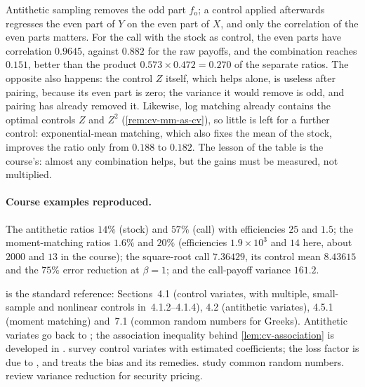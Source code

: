 \begin{remark}\label{rem:cv-combine}
Antithetic sampling removes the odd part $f_{\mathrm o}$; a control applied afterwards
regresses the even part of $Y$ on the even part of $X$, and only the correlation of the even
parts matters. For the call with the stock as control, the even parts have correlation
$0.9645$, against $0.882$ for the raw payoffs, and the combination reaches $0.151$, better than
the product $0.573\times0.472=0.270$ of the separate ratios. The opposite also happens: the
control $Z$ itself, which helps alone, is useless after pairing, because its even part is
zero; the variance it would remove is odd, and pairing has already removed it. Likewise, log
matching already contains the optimal controls $Z$ and $Z^2$ (\cref{rem:cv-mm-as-cv}), so
little is left for a further control: exponential-mean matching, which also fixes the mean of
the stock, improves the ratio only from $0.188$ to $0.182$. The lesson of the table is the course's: almost any combination
helps, but the gains must be measured, not multiplied.
\end{remark}

\paragraph{Course examples reproduced.} The antithetic ratios $14\%$ (stock) and $57\%$ (call)
with efficiencies $25$ and $1.5$; the moment-matching ratios $1.6\%$ and $20\%$ (efficiencies
$1.9\times10^3$ and $14$ here, about $2000$ and $13$ in the course); the square-root call
$7.36429$, its control mean $8.43615$ and the $75\%$ error reduction at $\beta=1$; and the
call-payoff variance $161.2$.


\furtherreading
\textcite{glasserman-mc} is the standard reference: Sections~4.1 (control variates, with
multiple, small-sample and nonlinear controls in~4.1.2--4.1.4), 4.2 (antithetic variates),
4.5.1 (moment matching) and~7.1 (common random numbers for Greeks). Antithetic variates go back to
\textcite{hammersley-morton}; the association inequality behind
\cref{lem:cv-association} is developed in \textcite{esary-proschan-walkup}.
\textcite{lavenberg-welch} survey control variates with estimated coefficients; the loss
factor is due to \textcite{lavenberg-moeller-welch}, and \textcite{nelson-cv} treats the bias
and its remedies. \textcite{glasserman-yao-crn} study common random numbers.
\textcite{boyle-broadie-glasserman} review variance reduction for security pricing.
